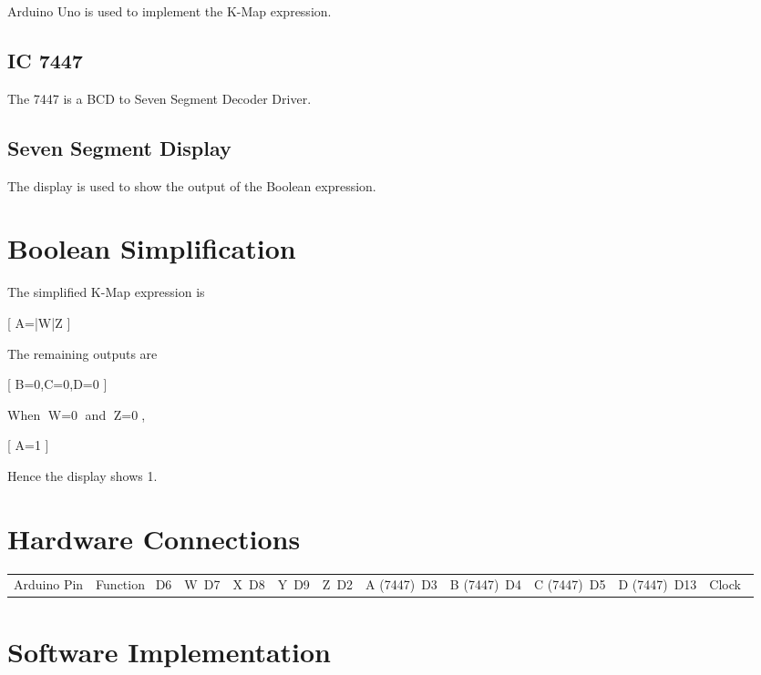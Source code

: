 \documentclass[a4paper,12pt]{article}
\begin{document}
Arduino Uno is used to implement the K-Map expression.

\subsection{IC 7447}

The 7447 is a BCD to Seven Segment Decoder Driver.

\subsection{Seven Segment Display}

The display is used to show the output of the Boolean expression.

\section{Boolean Simplification}

The simplified K-Map expression is

[
A=\bar{W}\bar{Z}
]

The remaining outputs are

[
B=0,\quad C=0,\quad D=0
]

When W=0 and Z=0,

[
A=1
]

Hence the display shows 1.

\section{Hardware Connections}

\begin{center}
\begin{tabular}{|c|c|}
\hline
Arduino Pin & Function\
\hline
D6 & W\
D7 & X\
D8 & Y\
D9 & Z\
D2 & A (7447)\
D3 & B (7447)\
D4 & C (7447)\
D5 & D (7447)\
D13 & Clock\
\hline
\end{tabular}
\end{center}

\section{Software Implementation}
\end{document}
